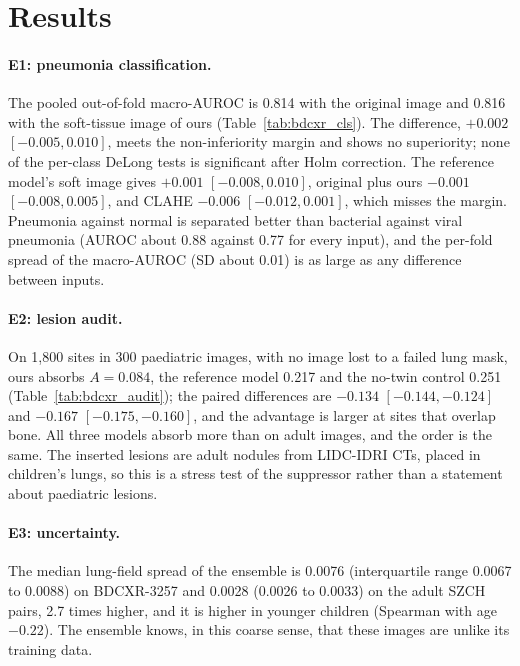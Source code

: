 \section{Results}
\paragraph{E1: pneumonia classification.} The pooled out-of-fold macro-AUROC is 0.814 with the original image and 0.816 with the soft-tissue
image of ours (Table~\ref{tab:bdcxr_cls}). The difference, $+0.002$ $[-0.005,0.010]$, meets the non-inferiority margin and shows no superiority;
none of the per-class DeLong tests is significant after Holm correction. The reference model's soft image gives $+0.001$ $[-0.008,0.010]$,
original plus ours $-0.001$ $[-0.008,0.005]$, and CLAHE $-0.006$ $[-0.012,0.001]$, which misses the margin. Pneumonia against normal is
separated better than bacterial against viral pneumonia (AUROC about 0.88 against 0.77 for every input), and the per-fold spread of the
macro-AUROC (SD about 0.01) is as large as any difference between inputs.

\paragraph{E2: lesion audit.} On 1,800 sites in 300 paediatric images, with no image lost to a failed lung mask, ours absorbs $A=0.084$, the
reference model 0.217 and the no-twin control 0.251 (Table~\ref{tab:bdcxr_audit}); the paired differences are $-0.134$ $[-0.144,-0.124]$ and
$-0.167$ $[-0.175,-0.160]$, and the advantage is larger at sites that overlap bone. All three models absorb more than on adult images, and the
order is the same. The inserted lesions are adult nodules from LIDC-IDRI CTs, placed in children's lungs, so this is a stress test of the
suppressor rather than a statement about paediatric lesions.

\paragraph{E3: uncertainty.} The median lung-field spread of the ensemble is 0.0076 (interquartile range 0.0067 to 0.0088) on BDCXR-3257 and
0.0028 (0.0026 to 0.0033) on the adult SZCH pairs, 2.7 times higher, and it is higher in younger children (Spearman with age $-0.22$). The
ensemble knows, in this coarse sense, that these images are unlike its training data.
\begin{table}[htbp]
\centering\small
\caption{BDCXR-3257: pneumonia classification (normal, bacterial, viral), five folds over near-duplicate groups $\times$ three seeds; pooled
out-of-fold macro-AUROC, per-fold mean $\pm$ SD and the difference to the original image (group bootstrap).}
\label{tab:bdcxr_cls}
\end{table}
\begin{table}[htbp]
\centering\small
\caption{BDCXR-3257: lesion audit on a fixed class-stratified subset of 300 images (1,800 sites).}
\label{tab:bdcxr_audit}
\end{table}

